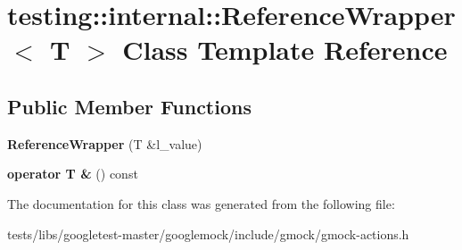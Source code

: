\hypertarget{classtesting_1_1internal_1_1ReferenceWrapper}{}\section{testing\+:\+:internal\+:\+:Reference\+Wrapper$<$ T $>$ Class Template Reference}
\label{classtesting_1_1internal_1_1ReferenceWrapper}
\subsection*{Public Member Functions}
\begin{DoxyCompactItemize}
\item 
\mbox{\label{classtesting_1_1internal_1_1ReferenceWrapper_ad33597ffc478c3af9190d1a288a76d39}} 
{\bfseries Reference\+Wrapper} (T \&l\+\_\+value)
\item 
\mbox{\label{classtesting_1_1internal_1_1ReferenceWrapper_a187d6e6ffb4031444fff10dee7dc7de8}} 
{\bfseries operator T \&} () const
\end{DoxyCompactItemize}


The documentation for this class was generated from the following file\+:\begin{DoxyCompactItemize}
\item 
tests/libs/googletest-\/master/googlemock/include/gmock/gmock-\/actions.\+h\end{DoxyCompactItemize}
